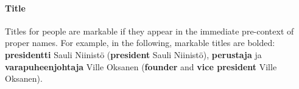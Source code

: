 \documentclass[11pt]{article}
\begin{document}
\paragraph{Title}

Titles for people are markable if they appear in the immediate pre-context of proper names. For example, in the following, markable titles are bolded: \textbf{presidentti} Sauli Niinist\"o (\textbf{president} Sauli Niinist\"o), \textbf{perustaja} ja \textbf{varapuheenjohtaja} Ville Oksanen (\textbf{founder} and \textbf{vice president} Ville Oksanen).   











 
\end{document}
